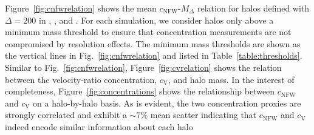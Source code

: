 \documentclass[usenatbib]{mnras}
\begin{document}
Figure~\ref{fig:cnfwrelation} shows the mean $c_{\mathrm{NFW}}$-$M_{\Delta}$ relation for halos defined with
$\Delta=200$ in \simA, \simB, and \simC. For each simulation, we consider halos only above a minimum mass threshold 
to ensure that concentration measurements are not compromised by resolution effects. The minimum mass 
thresholds are shown as the vertical lines in Fig.~\ref{fig:cnfwrelation} and listed in Table~\ref{table:thresholds}. 
Similar to Fig.~\ref{fig:cnfwrelation}, Figure~\ref{fig:cvrelation} shows the relation between the velocity-ratio concentration, $c_{\mathrm{V}}$, and halo mass. In the interest of completeness, Figure~\ref{fig:concentrations} shows the relationship 
between $c_{\mathrm{NFW}}$ and $c_{\mathrm{V}}$ on a halo-by-halo basis. As is evident, the two concentration 
proxies are strongly correlated and exhibit a $\sim 7\%$ mean scatter indicating that $c_{\mathrm{NFW}}$ and $c_{\mathrm{V}}$ 
indeed encode similar information about each halo 
\end{document}
